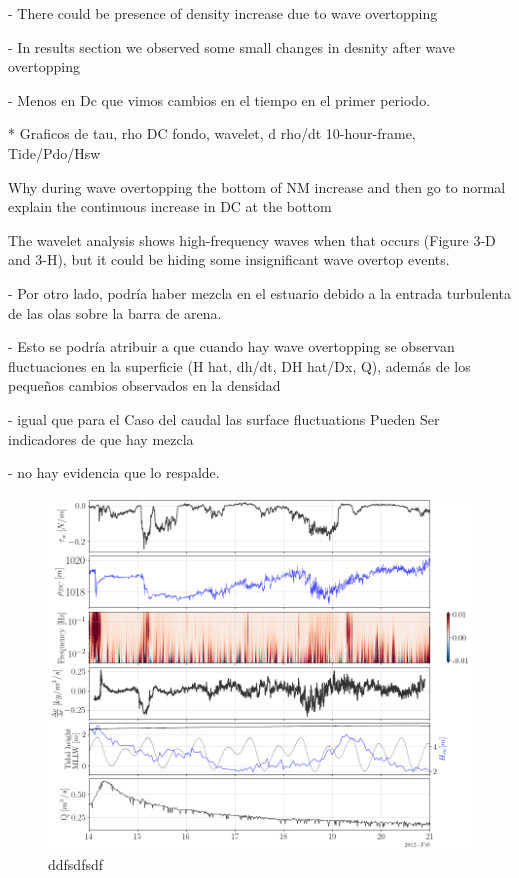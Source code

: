 \documentclass[tesis.tex]{subfiles}
\begin{document}
- There could be presence of density increase due to wave overtopping 

- In results section we observed some small changes in desnity after wave overtopping 

- Menos en Dc que vimos cambios en el tiempo en el primer periodo.

* Graficos de tau, rho DC fondo, wavelet, d rho/dt 10-hour-frame, Tide/Pdo/Hsw

Why during wave overtopping the bottom of NM increase and then go to normal
explain the  continuous increase in DC at the bottom

The wavelet analysis shows high-frequency waves when that occurs (Figure 3-D and 3-H), but it could be hiding some insignificant wave overtop events.

- Por otro lado, podría haber mezcla en el estuario debido a la entrada turbulenta de las olas sobre la barra de arena.

- Esto se podría atribuir a que cuando hay wave overtopping se observan fluctuaciones en la superficie (H hat, dh/dt, DH hat/Dx, Q), además de los pequeños cambios observados en la densidad

- igual que para el Caso del caudal las surface fluctuations Pueden Ser indicadores de que hay mezcla

- no hay evidencia que lo respalde.

\begin{figure}[h!]
    \centering
    \includegraphics[width=\textwidth]{Imagenes/mix_wo.png}
    \caption{ddfsdfsdf }
    \label{fig:mix_wo}
\end{figure}
\end{document}
